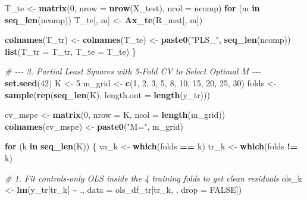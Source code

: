 \documentclass[
]{article}
\newenvironment{Shaded}{\begin{snugshade}}{\end{snugshade}}
\newcommand{\AttributeTok}[1]{\textcolor[rgb]{0.13,0.29,0.53}{#1}}
\newcommand{\CommentTok}[1]{\textcolor[rgb]{0.56,0.35,0.01}{\textit{#1}}}
\newcommand{\ConstantTok}[1]{\textcolor[rgb]{0.56,0.35,0.01}{#1}}
\newcommand{\ControlFlowTok}[1]{\textcolor[rgb]{0.13,0.29,0.53}{\textbf{#1}}}
\newcommand{\DecValTok}[1]{\textcolor[rgb]{0.00,0.00,0.81}{#1}}
\newcommand{\FunctionTok}[1]{\textcolor[rgb]{0.13,0.29,0.53}{\textbf{#1}}}
\newcommand{\NormalTok}[1]{#1}
\newcommand{\OtherTok}[1]{\textcolor[rgb]{0.56,0.35,0.01}{#1}}
\newcommand{\SpecialCharTok}[1]{\textcolor[rgb]{0.81,0.36,0.00}{\textbf{#1}}}
\newcommand{\StringTok}[1]{\textcolor[rgb]{0.31,0.60,0.02}{#1}}
\begin{document}
\begin{Shaded}
\begin{Highlighting}[]
\NormalTok{  T\_te }\OtherTok{\textless{}{-}} \FunctionTok{matrix}\NormalTok{(}\DecValTok{0}\NormalTok{, }\AttributeTok{nrow =} \FunctionTok{nrow}\NormalTok{(X\_test), }\AttributeTok{ncol =}\NormalTok{ ncomp)}
  \ControlFlowTok{for}\NormalTok{ (m }\ControlFlowTok{in} \FunctionTok{seq\_len}\NormalTok{(ncomp)) T\_te[, m] }\OtherTok{\textless{}{-}} \FunctionTok{Ax\_te}\NormalTok{(R\_mat[, m])}
  
  \FunctionTok{colnames}\NormalTok{(T\_tr) }\OtherTok{\textless{}{-}} \FunctionTok{colnames}\NormalTok{(T\_te) }\OtherTok{\textless{}{-}} \FunctionTok{paste0}\NormalTok{(}\StringTok{"PLS\_"}\NormalTok{, }\FunctionTok{seq\_len}\NormalTok{(ncomp))}
  \FunctionTok{list}\NormalTok{(}\AttributeTok{T\_tr =}\NormalTok{ T\_tr, }\AttributeTok{T\_te =}\NormalTok{ T\_te)}
\NormalTok{\}}

\CommentTok{\# {-}{-}{-} 3. Partial Least Squares with 5{-}Fold CV to Select Optimal M {-}{-}{-}}
\FunctionTok{set.seed}\NormalTok{(}\DecValTok{42}\NormalTok{)}
\NormalTok{K      }\OtherTok{\textless{}{-}} \DecValTok{5}
\NormalTok{m\_grid }\OtherTok{\textless{}{-}} \FunctionTok{c}\NormalTok{(}\DecValTok{1}\NormalTok{, }\DecValTok{2}\NormalTok{, }\DecValTok{3}\NormalTok{, }\DecValTok{5}\NormalTok{, }\DecValTok{8}\NormalTok{, }\DecValTok{10}\NormalTok{, }\DecValTok{15}\NormalTok{, }\DecValTok{20}\NormalTok{, }\DecValTok{25}\NormalTok{, }\DecValTok{30}\NormalTok{)}
\NormalTok{folds  }\OtherTok{\textless{}{-}} \FunctionTok{sample}\NormalTok{(}\FunctionTok{rep}\NormalTok{(}\FunctionTok{seq\_len}\NormalTok{(K), }\AttributeTok{length.out =} \FunctionTok{length}\NormalTok{(y\_tr)))}

\NormalTok{cv\_mspe }\OtherTok{\textless{}{-}} \FunctionTok{matrix}\NormalTok{(}\DecValTok{0}\NormalTok{, }\AttributeTok{nrow =}\NormalTok{ K, }\AttributeTok{ncol =} \FunctionTok{length}\NormalTok{(m\_grid))}
\FunctionTok{colnames}\NormalTok{(cv\_mspe) }\OtherTok{\textless{}{-}} \FunctionTok{paste0}\NormalTok{(}\StringTok{"M="}\NormalTok{, m\_grid)}

\ControlFlowTok{for}\NormalTok{ (k }\ControlFlowTok{in} \FunctionTok{seq\_len}\NormalTok{(K)) \{}
\NormalTok{  va\_k }\OtherTok{\textless{}{-}} \FunctionTok{which}\NormalTok{(folds }\SpecialCharTok{==}\NormalTok{ k)}
\NormalTok{  tr\_k }\OtherTok{\textless{}{-}} \FunctionTok{which}\NormalTok{(folds }\SpecialCharTok{!=}\NormalTok{ k)}
  
  \CommentTok{\# 1. Fit controls{-}only OLS inside the 4 training folds to get clean residuals}
\NormalTok{  ols\_k }\OtherTok{\textless{}{-}} \FunctionTok{lm}\NormalTok{(y\_tr[tr\_k] }\SpecialCharTok{\textasciitilde{}}\NormalTok{ ., }\AttributeTok{data =}\NormalTok{ ols\_df\_tr[tr\_k, , }\AttributeTok{drop =} \ConstantTok{FALSE}\NormalTok{])}
  

\end{Highlighting}
\end{Shaded}
\end{document}
